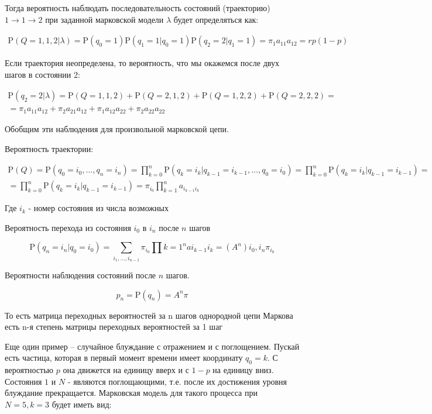 \documentclass[letterpaper, 11pt]{article}
\newcommand{\prob}{\mathrm{P}}
\begin{document}
Тогда вероятность наблюдать последовательность состояний (траекторию) $1\to1\to2$ при заданной марковской модели $\lambda$ будет определяться как:

\begin{gather}
\prob(Q=1,1,2|\lambda)=\prob(q_0=1)\prob(q_1=1|q_0=1)\prob(q_2=2|q_1=1)=
\pi_1 a_{11}a_{12}=rp(1-p)
\end{gather}


Если траектория неопределена, то вероятность, что мы окажемся после двух шагов в состоянии 2:

\begin{gather}
\prob(q_2=2|\lambda)=\prob(Q=1,1,2)+\prob(Q=2,1,2)+\prob(Q=1,2,2)+\prob(Q=2,2,2)=\\=
\pi_1 a_{11}a_{12}+\pi_2 a_{21}a_{12}+\pi_1 a_{12}a_{22}+\pi_2 a_{22}a_{22}
\end{gather}

Обобщим эти наблюдения для произвольной марковской цепи.

Вероятность траектории:

\begin{gather}
\prob(Q)=\prob(q_0=i_0,\ldots,q_n=i_n)=
\prod_{k=0}^n\prob(q_k=i_k|q_{k-1}=i_{k-1},\ldots,q_{0}=i_{0})=
\prod_{k=0}^n\prob(q_k=i_k|q_{k-1}=i_{k-1})=\\=
\prod_{k=0}^n\prob(q_k=i_k|q_{k-1}=i_{k-1})=\pi_{i_0}\prod_{k=1}^n a_{i_{k-1}i_{k}}
\end{gather}

Где $i_k$ - номер состояния из числа возможных 

Вероятность перехода из состояния $i_0$ в $i_n$ после $n$ шагов

$$\prob(q_n=i_n|q_0=i_0)=\sum_{i_1,\ldots,i_{n-1}}\pi_{i_0}\prod{k=1}^n a{i_{k-1}i_{k}}=(A^n){i_0,i_n}\pi_{i_0}$$

Вероятности наблюдения состояний после $n$ шагов.

$$p_n=\prob(q_n)=A^n\pi$$

То есть матрица переходных вероятностей за n шагов однородной цепи Маркова есть n-я степень матрицы переходных вероятностей за 1 шаг

Еще один пример -- случайное блуждание с отражением и с поглощением. Пускай есть частица, которая в первый момент времени имеет координату $q_0=k$. С вероятностью $p$ она движется на единицу вверх и с $1-p$ на единицу вниз. Состояния $1$ и $N$ - являются поглощающими, т.е. после их достижения уровня блуждание прекращается. Марковская модель для такого процесса при $N=5, k=3$ будет иметь вид:
\end{document}
